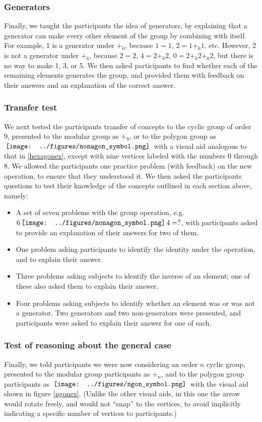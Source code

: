 \documentclass[man,10pt]{apa6}
\newcommand{\nonagon}{\,\vcenter{\hbox{\texttt{[image: ../figures/nonagon\_symbol.png]}}}\,}
\newcommand{\ngon}{\,\vcenter{\hbox{\texttt{[image: ../figures/ngon\_symbol.png]}}}\,}
\begin{document}
\subsubsection{Generators}
Finally, we taught the participants the idea of generators, by explaining that a generator can make every other element of the group by combining with itself. For example, 1 is a generator under $+_6$, because $1 = 1$, $2 = 1 +_6 1$, etc. However, 2 is not a generator under $+_6$, because $2 = 2$, $4 = 2 +_6 2$, $0 = 2 +_6 2 +_6 2$, but there is no way to make 1, 3, or 5. We then asked participants to find whether each of the remaining elements generates the group, and provided them with feedback on their answers and an explanation of the correct answer.
\subsubsection{Transfer test}
We next tested the participants transfer of concepts to the cyclic group of order 9, presented to the modular group as $+_9$, or to the polygon group as $\nonagon$ with a visual aid analogous to that in \ref{hexagonex}, except with nine vertices labeled with the numbers 0 through 8. We allowed the participants one practice problem (with feedback) on the new operation, to ensure that they understood it. We then asked the participants questions to test their knowledge of the concepts outlined in each section above, namely:
\begin{itemize} 
\item A set of seven problems with the group operation, e.g. $6 \nonagon 4 = ?$, with participants asked to provide an explanation of their answers for two of them. 
\item One problem asking participants to identify the identity under the operation, and to explain their answer.
\item Three problems asking subjects to identify the inverse of an element; one of these also asked them to explain their answer.
\item Four problems asking subjects to identify whether an element was or was not a generator. Two generators and two non-generators were presented, and participants were asked to explain their answer for one of each.
\end{itemize}
\subsubsection{Test of reasoning about the general case}
Finally, we told participants we were now considering an order $n$ cyclic group, presented to the modular group participants as $+_n$, and to the polygon group participants as $\ngon$ with the visual aid shown in figure \ref{ngonex}. (Unlike the other visual aids, in this one the arrow would rotate freely, and would not ``snap'' to the vertices, to avoid implicitly indicating a specific number of vertices to participants.) 
\end{document}
